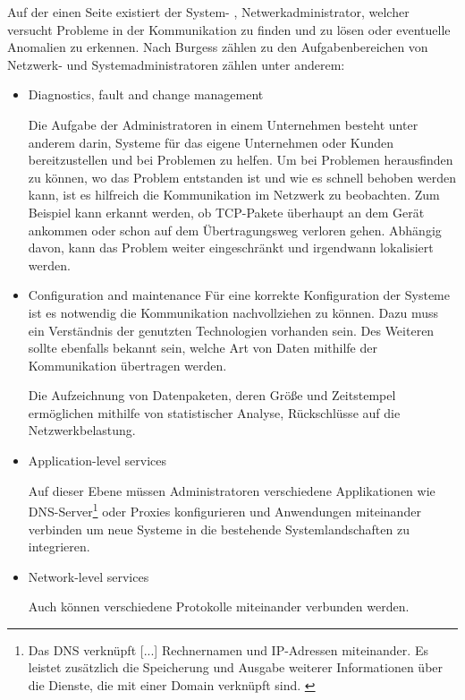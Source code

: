     Auf der einen Seite existiert der System- , Netwerkadministrator, welcher versucht Probleme in der Kommunikation zu finden und zu lösen oder eventuelle Anomalien zu erkennen.
    Nach Burgess \cite{burgess2004principles} zählen zu den Aufgabenbereichen von Netzwerk- und Systemadministratoren zählen unter anderem:
    \begin{itemize}
        \item \glqq Diagnostics, fault and change management\grqq{}
        
        Die Aufgabe der Administratoren in einem Unternehmen besteht unter anderem darin, Systeme für das eigene Unternehmen oder Kunden bereitzustellen und bei Problemen zu helfen. Um bei Problemen herausfinden zu können, wo das Problem entstanden ist und wie es schnell behoben werden kann, ist es hilfreich die Kommunikation im Netzwerk zu beobachten. Zum Beispiel kann erkannt werden, ob \ac{TCP}-Pakete überhaupt an dem Gerät ankommen oder schon auf dem Übertragungsweg verloren gehen. Abhängig davon, kann das Problem weiter eingeschränkt und irgendwann lokalisiert werden.
        
        \item \glqq Configuration and maintenance\grqq{}
        Für eine korrekte Konfiguration der Systeme ist es notwendig die Kommunikation nachvollziehen zu können. Dazu muss ein Verständnis der genutzten Technologien vorhanden sein. Des Weiteren sollte ebenfalls bekannt sein, welche Art von Daten mithilfe der Kommunikation übertragen werden.
        
        Die Aufzeichnung von Datenpaketen, deren Größe und Zeitstempel ermöglichen mithilfe von statistischer Analyse, Rückschlüsse auf die Netzwerkbelastung.
        
        \item \glqq Application-level services\grqq{}
        
        Auf dieser Ebene müssen Administratoren verschiedene Applikationen wie \ac{DNS}-Server\footnote{\glqq Das DNS verknüpft [...] Rechnernamen und IP-Adressen miteinander. Es leistet zusätzlich die Speicherung und Ausgabe weiterer Informationen über die Dienste, die mit einer Domain verknüpft sind.\grqq{} \cite{denic_eg}} oder Proxies konfigurieren und Anwendungen miteinander verbinden um neue Systeme in die bestehende Systemlandschaften zu integrieren.
        
        \item \glqq Network-level services\grqq{}
        
        Auch können verschiedene Protokolle miteinander verbunden werden.
        
    \end{itemize}

